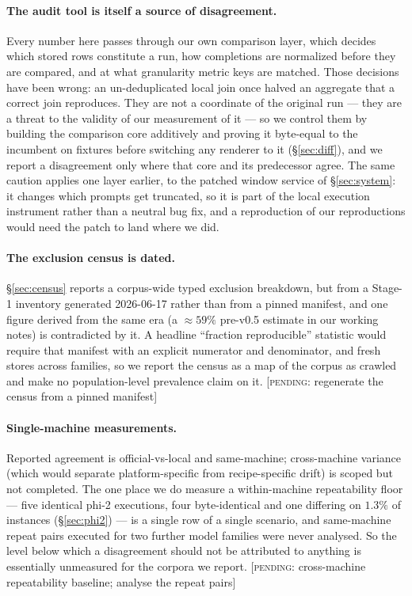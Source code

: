 \paragraph{The audit tool is itself a source of disagreement.} Every number here
passes through our own comparison layer, which decides which stored rows
constitute a run, how completions are normalized before they are compared, and at
what granularity metric keys are matched. Those decisions have been wrong: an
un-deduplicated local join once halved an aggregate that a correct join
reproduces. They are not a coordinate of the original run --- they are a threat to
the validity of our measurement of it --- so we control them by building the
comparison core additively and proving it byte-equal to the incumbent on fixtures
before switching any renderer to it (\S\ref{sec:diff}), and we report a
disagreement only where that core and its predecessor agree. The same caution
applies one layer earlier, to the patched window service of \S\ref{sec:system}:
it changes which prompts get truncated, so it is part of the local execution
instrument rather than a neutral bug fix, and a reproduction of our
reproductions would need the patch to land where we did.

\paragraph{The exclusion census is dated.} \S\ref{sec:census} reports a
corpus-wide typed exclusion breakdown, but from a Stage-1 inventory generated
2026-06-17 rather than from a pinned manifest, and one figure derived from the
same era (a ${\approx}59\%$ pre-v0.5 estimate in our working notes) is
contradicted by it. A headline ``fraction reproducible'' statistic would require
that manifest with an explicit numerator and denominator, and fresh stores across
families, so we report the census as a map of the corpus as crawled and make no
population-level prevalence claim on it.
{\color{orange}\textsf{\small[\textsc{pending}: regenerate the census from a pinned manifest]}}

\paragraph{Single-machine measurements.} Reported agreement is
official-vs-local and same-machine; cross-machine variance (which would separate
platform-specific from recipe-specific drift) is scoped but not completed.
The one place we do measure a within-machine repeatability floor --- five identical
phi-2 executions, four byte-identical and one differing on $1.3\%$ of instances
(\S\ref{sec:phi2}) --- is a single row of a single scenario, and same-machine
repeat pairs executed for two further model families were never analysed. So the
level below which a disagreement should not be attributed to anything is
essentially unmeasured for the corpora we report.
{\color{orange}\textsf{\small[\textsc{pending}: cross-machine repeatability baseline; analyse the repeat pairs]}}

